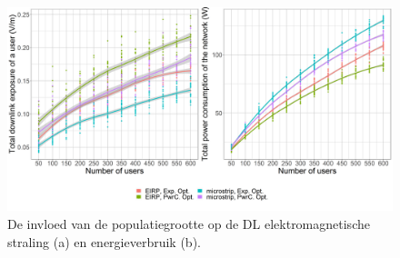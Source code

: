 \documentclass[twocolumn]{phdsymp_dutch}
\begin{document}
\begin{figure}[h!]
  \includegraphics[width=\linewidth]{../results/s3/uvsdlAndPc.png}
  \caption{ De invloed van de populatiegrootte op de \acs{DL} elektromagnetische straling (a) en energieverbruik (b).
    }
  \label{fig:s3b_dlAndPC}
\end{figure}
\end{document}

